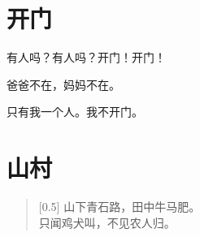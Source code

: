 \documentclass[12pt,UTF-8,openany]{ctexbook}
\begin{document}
\hanzibox{}\hanzibox{}\hanzibox{}\hanzibox{}\hspace{1em}\hanzibox{}\hanzibox{}\hanzibox{}\hanzibox{}






\chapter{开门}

\begin{large}
    
    有人吗？有人吗？开门！开门！
    
    爸爸不在，妈妈不在。
    
    只有我一个人。我不开门。
    
\end{large}


\clearpage

\begin{center}
    
\end{center}


\hanzibox{}\hanzibox{}\hanzibox{}\hanzibox{}\hspace{1em}\hanzibox{}\hanzibox{}\hanzibox{}\hanzibox{}

\hanzibox{}\hanzibox{}\hanzibox{}\hanzibox{}\hspace{1em}\hanzibox{}\hanzibox{}\hanzibox{}\hanzibox{}

\hanzibox{}\hanzibox{}\hanzibox{}\hanzibox{}\hspace{1em}\hanzibox{}\hanzibox{}\hanzibox{}\hanzibox{}

\hanzibox{}\hanzibox{}\hanzibox{}\hanzibox{}\hspace{1em}




\chapter{山村}

\begin{large}
    
    \begin{verse}[0.5\linewidth]
        山下青石路，田中牛马肥。 \\
        只闻鸡犬叫，不见农人归。
    \end{verse}
    
\end{large}
\end{document}
